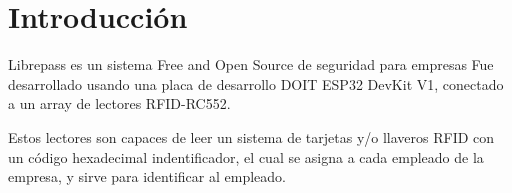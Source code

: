 \documentclass[../informe_krapp.tex]{subfiles}
\begin{document}
\graphicspath{{../images/}}
\section{Introducción}
Librepass es un sistema Free and Open Source de seguridad para empresas
Fue desarrollado usando una placa de desarrollo DOIT ESP32 DevKit V1, conectado
a un array de lectores RFID-RC552.

Estos lectores son capaces de leer un sistema de tarjetas y/o llaveros RFID con un
código hexadecimal indentificador, el cual se asigna a cada empleado de la empresa, y
sirve para identificar al empleado.
\end{document}

